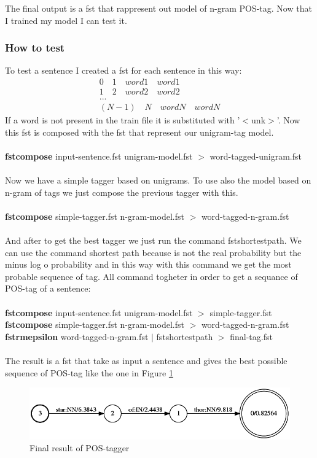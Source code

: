 \documentclass[a4paper,8pt,oneside]{article}
\begin{document}
			The final output is a fst that rappresent out model of n-gram POS-tag.
			Now that I trained my model I can test it.

		\subsubsection{How to test}
		    To test a sentence I created a fst for each sentence in this way:
			\begin{gather*}
					0 \quad 1 \quad word1 \quad word1 \\
					1 \quad 2 \quad word2 \quad word2 \\
					... \\
					(N-1) \quad N \quad wordN \quad wordN	
			\end{gather*}
			If a word is not present in the train file it is substituted with '$<$unk$>$'.
			Now this fst is composed with the fst that represent our unigram-tag model. \\ \\
			\textbf{fstcompose} input-sentence.fst unigram-model.fst $>$ word-tagged-unigram.fst \\ \\
			Now we have a simple tagger based on unigrams. To use also the model based on n-gram of tags we just compose the previous tagger with this. \\ \\
			\textbf{fstcompose} simple-tagger.fst n-gram-model.fst $>$ word-tagged-n-gram.fst \\ \\
			And after to get the best tagger we just run the command fstshortestpath. We can use the command shortest path because is not the real probability but the minus log o probability and in this way with this command we get the most probable sequence of tag. All command togheter in order to get a sequance of POS-tag of a sentence: \\ \\
			\textbf{fstcompose} input-sentence.fst unigram-model.fst $>$ simple-tagger.fst \\
			\textbf{fstcompose} simple-tagger.fst n-gram-model.fst $>$ word-tagged-n-gram.fst \\
			\textbf{fstrmepsilon} word-tagged-n-gram.fst $|$ fstshortestpath $>$ final-tag.fst \\ \\

			The result is a fst that take as input a sentence and gives the best possible sequence of POS-tag like the one in Figure \ref{tagger-final}
			\begin{figure}[h!]
			  \centering
			    \includegraphics[width=1.0\textwidth]{img/tagger}
			  \caption{Final result of POS-tagger}
			  \label{tagger-final}
			\end{figure}
\end{document}
